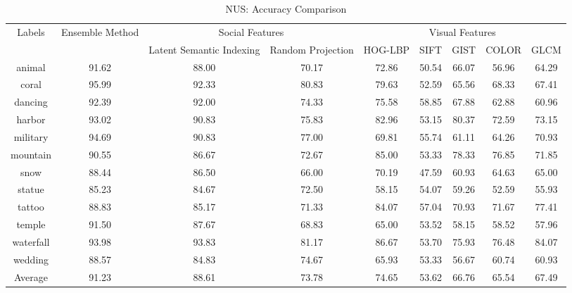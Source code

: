 \newpage
\begin{sidewaystable}[ht]
\caption{NUS: Accuracy Comparison} %
\vspace*{0.2 cm}
\begin{tabular}{|c|c|c|c|c|c|c|c|c|} %
Labels  & Ensemble Method  &\multicolumn{2}{c}{Social Features}  &\multicolumn{5}{c}{Visual Features}\\ [0.5ex] 
  &  & Latent Semantic Indexing & Random Projection & HOG-LBP & SIFT & GIST & COLOR & GLCM \\  [1ex]
  \hline
animal & 91.62 & 88.00 & 70.17 & 72.86 & 50.54 & 66.07 & 56.96 & 64.29 \\  [1ex]
coral & 95.99 & 92.33 & 80.83 & 79.63 & 52.59 & 65.56 & 68.33 & 67.41 \\  [1ex]
dancing & 92.39 & 92.00 & 74.33 & 75.58 & 58.85 & 67.88 & 62.88 & 60.96 \\  [1ex]
harbor & 93.02 & 90.83 & 75.83 & 82.96 & 53.15 & 80.37 & 72.59 & 73.15 \\  [1ex]
military & 94.69 & 90.83 & 77.00 & 69.81 & 55.74 & 61.11 & 64.26 & 70.93 \\  [1ex]
mountain & 90.55 & 86.67 & 72.67 & 85.00 & 53.33 & 78.33 & 76.85 & 71.85 \\  [1ex]
snow & 88.44 & 86.50 & 66.00 & 70.19 & 47.59 & 60.93 & 64.63 & 65.00 \\  [1ex]
statue & 85.23 & 84.67 & 72.50 & 58.15 & 54.07 & 59.26 & 52.59 & 55.93 \\  [1ex]
tattoo & 88.83 & 85.17 & 71.33 & 84.07 & 57.04 & 70.93 & 71.67 & 77.41 \\  [1ex]
temple & 91.50 & 87.67 & 68.83 & 65.00 & 53.52 & 58.15 & 58.52 & 57.96 \\  [1ex]
waterfall & 93.98 & 93.83 & 81.17 & 86.67 & 53.70 & 75.93 & 76.48 & 84.07 \\  [1ex]
wedding & 88.57 & 84.83 & 74.67 & 65.93 & 53.33 & 56.67 & 60.74 & 60.93 \\  [1ex]
\hline
Average & 91.23 & 88.61 & 73.78 & 74.65 & 53.62 & 66.76 & 65.54 & 67.49 \\  [1ex]
\hline %
\end{tabular}
\label{table:NUSAccuracy} %
\end{sidewaystable}

